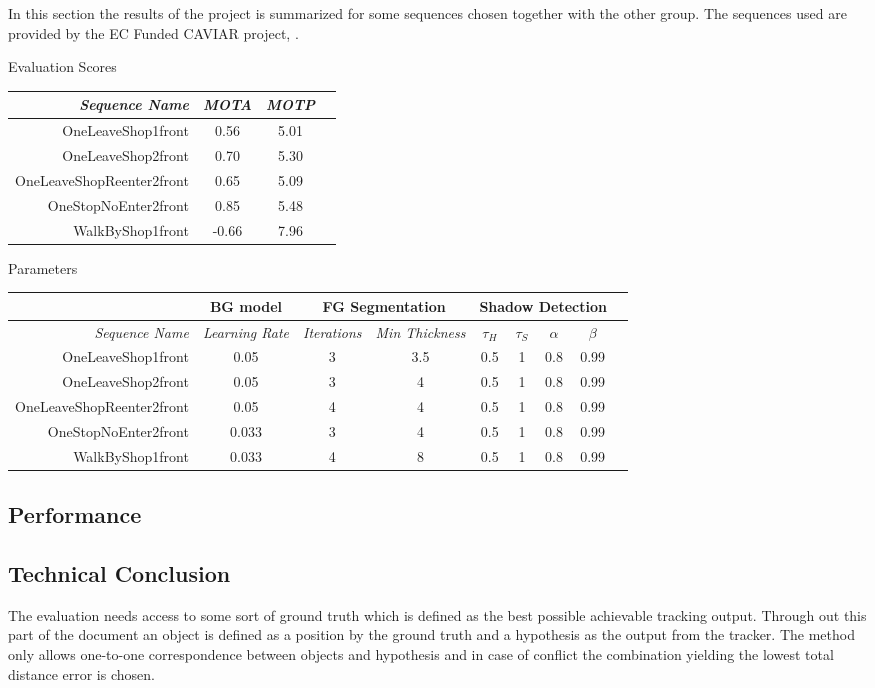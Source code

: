 In this section the results of the project is summarized for some sequences chosen together with the other group. The sequences used are provided by the EC Funded CAVIAR project, \cite{CAVIAR}.

Evaluation Scores

\begin{center}
	\begin{tabular}{r | c | c | c }
		\emph{Sequence Name}		& \emph{MOTA} & \emph{MOTP} \\
		\hline \hline
		OneLeaveShop1front			& 0.56 & 5.01 \\
		OneLeaveShop2front			& 0.70 & 5.30 \\
		OneLeaveShopReenter2front	& 0.65 & 5.09 \\
		OneStopNoEnter2front 		& 0.85 & 5.48 \\
		WalkByShop1front 			& -0.66 & 7.96 \\
	\end{tabular}
\end{center}

Parameters

\begin{center}
	\begin{tabular}{r | c || c | c || c | c | c | c | c }
	&	\multicolumn{1}{|c||}{BG model} & \multicolumn{2}{c||}{FG Segmentation} &\multicolumn{4}{c|}{Shadow Detection} \\
		\hline
		\emph{Sequence Name} & \emph{Learning Rate} & \emph{Iterations} & \emph{Min Thickness} &\emph{$\tau_H$} & \emph{$\tau_S$} & \emph{$\alpha$} & \emph{$\beta$}\\ 
		\hline \hline
		OneLeaveShop1front			& 0.05 		& 3 & 3.5 	& 0.5 & 1 & 0.8 & 0.99\\
		OneLeaveShop2front			& 0.05 		& 3 & 4 	& 0.5 & 1 & 0.8 & 0.99\\
		OneLeaveShopReenter2front	& 0.05		& 4 & 4 	& 0.5 & 1 & 0.8 & 0.99\\
		OneStopNoEnter2front 		& 0.033		& 3 & 4 	& 0.5 & 1 & 0.8 & 0.99\\
		WalkByShop1front 			& 0.033 	& 4 & 8 	& 0.5 & 1 & 0.8 & 0.99\\
	\end{tabular}
\end{center}

\subsection{Performance}


\subsection{Technical Conclusion}
The evaluation needs access to some sort of ground truth which is defined as the best possible achievable tracking output. Through out this part of the document an object is defined as a position by the ground truth and a hypothesis as the output from the tracker. The method only allows one-to-one correspondence between objects and hypothesis and in case of conflict the combination yielding the lowest total distance error is chosen.

